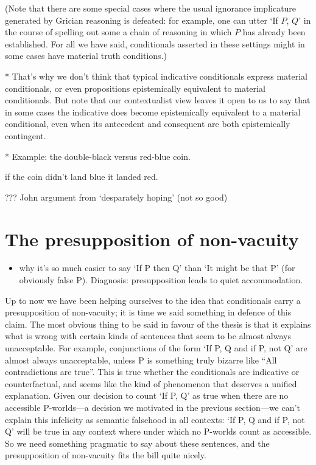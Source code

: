 \documentclass[If.tex]{subfiles}
\begin{document}
(Note that there are some special cases where the usual ignorance implicature generated by Grician reasoning is defeated: for example, one can utter ‘If $P$, $Q$’ in the course of spelling out some a chain of reasoning in which $P$ has already been established.  For all we have said, conditionals asserted in these settings might in some cases have material truth conditions.)



* That's why we don't think that typical indicative conditionals express material conditionals, or even propositions epistemically equivalent to material conditionals.  But note that our contextualist view leaves it open to us to say that in some cases the indicative does become epistemically equivalent to a material conditional, even when its antecedent and consequent are both epistemically contingent.  

* Example: the double-black versus red-blue coin.  
\begin{prop}
	 if the coin didn't land blue it landed red.
\end{prop}
??? John argument from ‘desparately hoping’ (not so good)


\section{The presupposition of non-vacuity}
\label{sect:nonvacuity}
\begin{itemize} 
	\item
	why it's so much easier to say ‘If P then Q’ than ‘It might be that P’ (for obviously false P). Diagnosis: presupposition leads to quiet accommodation.
\end{itemize}

Up to now we have been helping ourselves to the idea that conditionals carry a presupposition of non-vacuity; it is time we said something in defence of this claim. The most obvious thing to be said in favour of the thesis is that it explains what is wrong with certain kinds of sentences that seem to be almost always unacceptable. For example, conjunctions of the form ‘If P, Q and if P, not Q’ are almost always unacceptable, unless P is something truly bizarre like “All contradictions are true”. This is true whether the conditionals are indicative or counterfactual, and seems like the kind of phenomenon that deserves a unified explanation. Given our decision to count ‘If P, Q’ as true when there are no accessible P-worlds---a decision we motivated in the previous section---we can't explain this infelicity as semantic falsehood in all contexts: ‘If P, Q and if P, not Q’ will be true in any context where under which no P-worlds count as accessible. So we need something pragmatic to say about these sentences, and the presupposition of non-vacuity fits the bill quite nicely.
\end{document}
